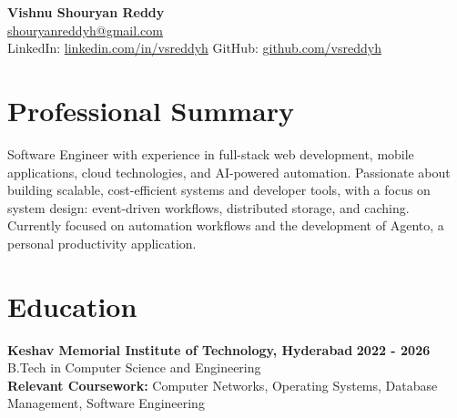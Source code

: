 \documentclass[a4paper,11pt]{article}
\newcommand{\resumeSubheading}[4]{%
  \textbf{#1} \hfill \textbf{#2} \\
{#3} \hfill {#4}
}
\begin{document}
\pagestyle{empty}
\raggedbottom
\addtolength{\textheight}{2\baselineskip}
\small

\begin{center}
  {\LARGE \textbf{Vishnu Shouryan Reddy}}\\[0.3em]
  \href{mailto:shouryanreddyh@gmail.com}{shouryanreddyh@gmail.com} \\[0.3em]
  LinkedIn: \href{https://linkedin.com/in/vsreddyh}{linkedin.com/in/vsreddyh} \textbar{} GitHub: \href{https://github.com/vsreddyh}{github.com/vsreddyh}
\end{center}
\vspace{-0.8em}

\section*{Professional Summary}

Software Engineer with experience in full-stack web development, mobile applications, cloud technologies, and AI-powered automation. Passionate about building scalable, cost-efficient systems and developer tools, with a focus on system design: event-driven workflows, distributed storage, and caching. Currently focused on automation workflows and the development of Agento, a personal productivity application.

\section*{Education}

\resumeSubheading
{Keshav Memorial Institute of Technology, Hyderabad}{2022 - 2026}
{B.Tech in Computer Science and Engineering}{} \\
\textbf{Relevant Coursework:} Computer Networks, Operating Systems, Database Management, Software Engineering


\end{document}
